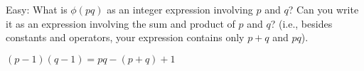  Easy: What is $\phi(pq)$ as an integer expression
  involving $p$ and $q$? Can you write it as an expression
  involving the sum and product of $p$ and $q$? (i.e., besides
  constants and operators, your 
  expression contains only $p+q$ and $pq$).

\BEGINCOMMENT
$(p-1)(q-1) = pq - (p+q) + 1$
\ENDCOMMENT

